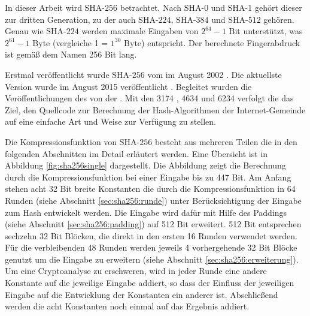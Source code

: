In dieser Arbeit wird SHA-$256$ betrachtet. Nach SHA-$0$ und SHA-$1$ gehört dieser zur dritten Generation, zu der auch SHA-$224$, SHA-$384$ und SHA-$512$ gehören.
Genau wie SHA-$224$ werden maximale Eingaben von $ 2^{64} - 1$ Bit unterstützt, was $ 2^{61} - 1 $ Byte (vergleiche 1  = $ 1^{30} $ Byte) entspricht.
Der berechnete Fingerabdruck ist gemäß dem Namen 256 Bit lang.

Erstmal veröffentlicht wurde SHA-$256$ vom  im August 2002 \cite{nist1802}. Die aktuellste Version wurde im August 2015 veröffentlicht \cite{nist1804}.
Begleitet wurden die Veröffentlichungen des  von der . Mit den  3174 \cite{rfc3174}, 4634 \cite{rfc4634} und 6234 \cite{rfc6234}
verfolgt die  das Ziel, den Quellcode zur Berechnung der Hash-Algorithmen der Internet-Gemeinde auf eine einfache Art und Weise zur Verfügung zu stellen.

Die Kompressionsfunktion von SHA-$256$ besteht aus mehreren Teilen die in den folgenden Abschnitten im Detail erläutert werden. Eine Übersicht ist in Abbildung
\ref{fig:sha256single} dargestellt. Die Abbildung zeigt die Berechnung durch die Kompressionsfunktion bei einer Eingabe bis zu 447 Bit. Am Anfang stehen acht
32 Bit breite Konstanten die durch die Kompressionsfunktion in 64 Runden (siehe Abschnitt \ref{sec:sha256:runde}) unter Berücksichtigung der Eingabe zum Hash
entwickelt werden. Die Eingabe wird dafür mit Hilfe des Paddings (siehe Abschnitt \ref{sec:sha256:padding}) auf 512 Bit erweitert. 512 Bit entsprechen sechzehn
32 Bit Blöcken, die direkt in den ersten 16 Runden verwendet werden. Für die verbleibenden 48 Runden werden jeweils 4 vorhergehende 32 Bit Blöcke genutzt um die
Eingabe zu erweitern (siehe Abschnitt \ref{sec:sha256:erweiterung}). Um eine Cryptoanalyse zu erschweren, wird in jeder Runde eine andere Konstante auf die
jeweilige Eingabe addiert, so dass der Einfluss der jeweiligen Eingabe auf die Entwicklung der Konstanten ein anderer ist. Abschließend werden die acht Konstanten
noch einmal auf das Ergebnis addiert.

